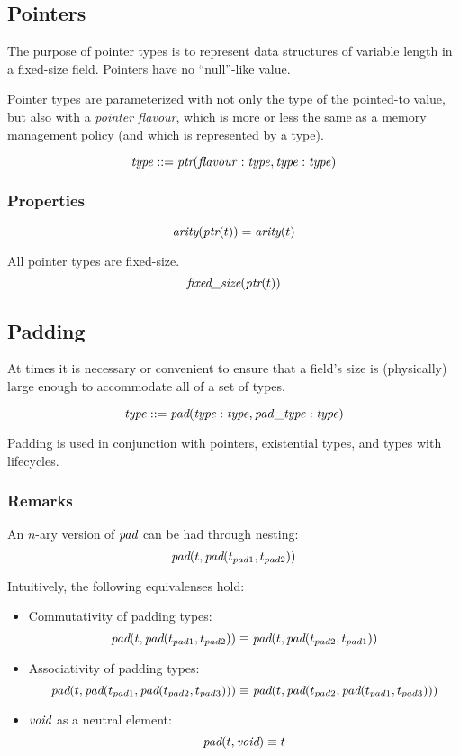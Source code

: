 \documentclass[a4paper]{report}
\newcommand\arity{{\ensuremath\textit{arity}}}
\newcommand\fixedsize{{\ensuremath\textit{fixed\_size}}}
\newcommand\tyPtr{{\ensuremath\textit{ptr}}}
\newcommand\tyPad{{\ensuremath\textit{pad}}}
\newcommand\tyVoid{{\ensuremath\textit{void}}}
\begin{document}
\subsection{Pointers}
The purpose of pointer types is to represent data structures of variable length
in a fixed-size field.
Pointers have no ``null''-like value.

Pointer types are parameterized with not only the type of the
pointed-to value, but also with a \emph{pointer flavour}, which is
more or less the same as a memory management policy (and which is
represented by a type).

$$\it type ::= \tyPtr(flavour: type, type : type)$$

\subsubsection*{Properties}
$$ \arity(\tyPtr(t)) = \arity(t)$$

All pointer types are fixed-size.
$$\fixedsize(\tyPtr(t))$$

\subsection{Padding}
At times it is necessary or convenient to ensure that a field's size is
(physically) large enough to accommodate all of a set of types.

$$\it type ::= \tyPad(type : type, pad\_type : type)$$

Padding is used in conjunction with pointers, existential types,
and types with lifecycles.

\subsubsection*{Remarks}
An $n$-ary version of $\tyPad$ can be had through nesting:
$$\tyPad(t, \tyPad(t_{pad1}, t_{pad2}))$$

\noindent
Intuitively, the following equivalenses hold:

\begin{itemize}
\item Commutativity of padding types:
$$\tyPad(t, \tyPad(t_{pad1}, t_{pad2})) \equiv
  \tyPad(t, \tyPad(t_{pad2}, t_{pad1}))$$

\item Associativity of padding types:
$$\tyPad(t, \tyPad(t_{pad1}, \tyPad(t_{pad2}, t_{pad3}))) \equiv
\tyPad(t, \tyPad(t_{pad2}, \tyPad(t_{pad1}, t_{pad3})))$$

\item $\tyVoid$ as a neutral element:
$$\tyPad(t, \tyVoid) \equiv t$$

\end{itemize}
\end{document}
